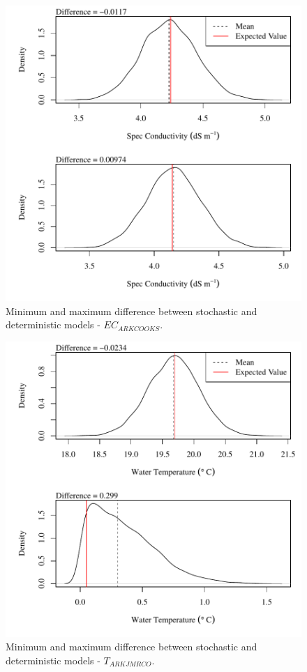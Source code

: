 \begin{center}
\begin{figure}[htbp]
	\includegraphics[width=6in]{"Figures/Results_DSR/V min-max diff ecout"}
	\caption{Minimum and maximum difference between stochastic and deterministic models - $EC_{ARKCOOKS}$.}
\end{figure}
\end{center}
\newpage

\begin{center}
\begin{figure}[htbp]
	\includegraphics[width=6in]{"Figures/Results_DSR/V min-max diff tin"}
	\caption{Minimum and maximum difference between stochastic and deterministic models - $T_{ARKJMRCO}$.}
\end{figure}
\end{center}
\newpage


